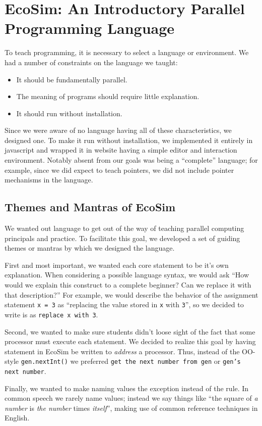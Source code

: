\documentclass{sig-alternate}
\begin{document}
\section{EcoSim: An Introductory Parallel Programming Language}
To teach programming, it is necessary to select a language or environment.
We had a number of constraints on the language we taught:
\begin{itemize}
	\item It should be fundamentally parallel.
	\item The meaning of programs should require little explanation.
	\item It should run without installation.
\end{itemize}
Since we were aware of no language having all of these characteristics, we designed one.
To make it run without installation, we implemented it entirely in javascript
and wrapped it in website having a simple editor and interaction environment.
Notably absent from our goals was being a ``complete'' language;
for example, since we did expect to teach pointers, we did not include pointer mechanisms in the language.

\subsection{Themes and Mantras of EcoSim}
We wanted out language to get out of the way of teaching parallel computing principals and practice.
To facilitate this goal, we developed a set of guiding themes or mantras by which we designed the language.

First and most important, we wanted each core statement to be it's own explanation.
When considering a possible language syntax, we would ask 
``How would we explain this construct to a complete beginner? Can we replace it with that description?''
For example, we would describe the behavior of the assignment statement \texttt{x = 3}
as ``replacing the value stored in \texttt{x} with \texttt{3}'',
so we decided to write is as \texttt{replace x with 3}.

Second, we wanted to make sure students didn't loose sight of the fact that some processor must execute each statement.
We decided to realize this goal by having statement in EcoSim be written to \emph{address} a processor.
Thus, instead of the OO-style \texttt{gen.nextInt()} we preferred 
\texttt{get the next number from gen} or \texttt{gen's next number}.

Finally, we wanted to make naming values the exception instead of the rule.
In common speech we rarely name values;
instead we say things like ``the square of \emph{a number} is \emph{the number} times \emph{itself}'',
making use of common reference techniques in English.
\end{document}
